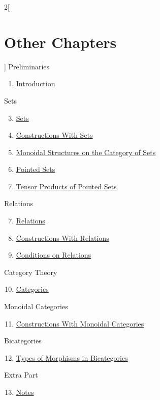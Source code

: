 \begin{multicols}{2}[\section{Other Chapters}]
\noindent
Preliminaries
\begin{enumerate}
\item \hyperref[introduction:section-phantom]{Introduction}
\end{enumerate}
Sets
\begin{enumerate}
\setcounter{enumi}{2}
\item \hyperref[sets:section-phantom]{Sets}
\item \hyperref[constructions-with-sets:section-phantom]{Constructions With Sets}
\item \hyperref[monoidal-structures-on-the-category-of-sets:section-phantom]{Monoidal Structures on the Category of Sets}
\item \hyperref[pointed-sets:section-phantom]{Pointed Sets}
\item \hyperref[tensor-products-of-pointed-sets:section-phantom]{Tensor Products of Pointed Sets}
\end{enumerate}
Relations
\begin{enumerate}
\setcounter{enumi}{6}
\item \hyperref[relations:section-phantom]{Relations}
\item \hyperref[constructions-with-relations:section-phantom]{Constructions With Relations}
\item \hyperref[conditions-on-relations:section-phantom]{Conditions on Relations}
\end{enumerate}
Category Theory
\begin{enumerate}
\setcounter{enumi}{9}
\item \hyperref[categories:section-phantom]{Categories}
\end{enumerate}
Monoidal Categories
\begin{enumerate}
\setcounter{enumi}{10}
\item \hyperref[constructions-with-monoidal-categories:section-phantom]{Constructions With Monoidal Categories}
\end{enumerate}
Bicategories
\begin{enumerate}
\setcounter{enumi}{11}
\item \hyperref[types-of-morphisms-in-bicategories:section-phantom]{Types of Morphisms in Bicategories}
\end{enumerate}
Extra Part
\begin{enumerate}
\setcounter{enumi}{12}
\item \hyperref[notes:section-phantom]{Notes}
\end{enumerate}
\end{multicols}
